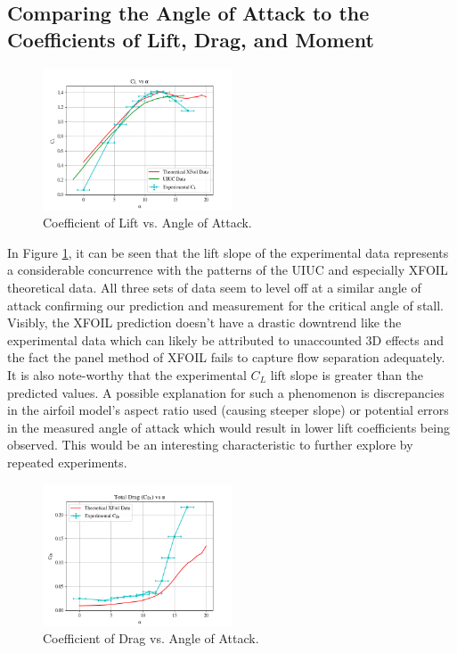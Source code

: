 \documentclass[11pt, letterpaper]{article}
\begin{document}
\subsection{Comparing the Angle of Attack to the Coefficients of Lift, Drag, and Moment}

\begin{figure}[h]
        \centering        
        \includegraphics[width=0.5\textwidth]{Figures/C_l-a.png}
        \caption{Coefficient of Lift vs. Angle of Attack.}
        \label{fig:1_C_l-a}
\end{figure}

In Figure \ref{fig:1_C_l-a}, it can be seen that the lift slope of the experimental data represents a considerable concurrence with the patterns of the UIUC and especially XFOIL theoretical data. All three sets of data seem to level off at a similar angle of attack confirming our prediction and measurement for the critical angle of stall. Visibly, the XFOIL prediction doesn't have a drastic downtrend like the experimental data which can likely be attributed to unaccounted 3D effects and the fact the panel method of XFOIL fails to capture flow separation adequately. It is also note-worthy that the experimental $C_L$ lift slope is greater than the predicted values. A possible explanation for such a phenomenon is discrepancies in the airfoil model's aspect ratio used (causing steeper slope) or potential errors in the measured angle of attack which would result in lower lift coefficients being observed. This would be an interesting characteristic to further explore by repeated experiments. 

\begin{figure}[h]
        \centering        
        \includegraphics[width=0.5\textwidth]{Figures/C_Dt-a.png}
        \caption{Coefficient of Drag vs. Angle of Attack.}
        \label{fig:1_C_dt-a}
\end{figure}
\end{document}

